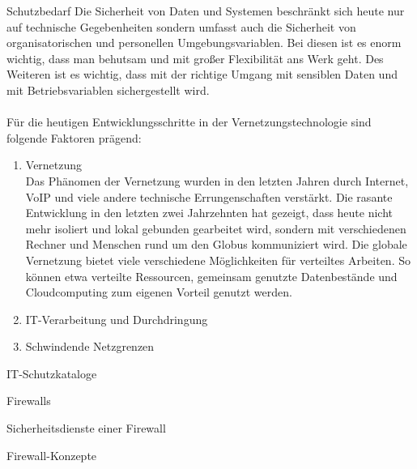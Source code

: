 \begin{section}{Schutzbedarf}
  Die Sicherheit von Daten und Systemen beschränkt sich heute nur auf technische 
  Gegebenheiten sondern umfasst auch die Sicherheit von organisatorischen und personellen 
  Umgebungsvariablen. Bei diesen ist es enorm wichtig, dass man behutsam und mit großer 
  Flexibilität ans Werk geht. Des Weiteren ist es wichtig, dass mit der richtige Umgang 
  mit sensiblen Daten und mit Betriebsvariablen sichergestellt wird. \\
  \\
  Für die heutigen Entwicklungsschritte in der Vernetzungstechnologie sind folgende 
  Faktoren prägend: \\
  
  \begin{enumerate} 
   \item Vernetzung \\
    Das Phänomen der Vernetzung wurden in den letzten Jahren durch Internet, VoIP und 
    viele andere technische Errungenschaften verstärkt. Die rasante Entwicklung in den 
    letzten zwei Jahrzehnten hat gezeigt, dass heute nicht mehr isoliert und lokal 
    gebunden gearbeitet wird, sondern mit verschiedenen Rechner und Menschen rund um den 
    Globus kommuniziert wird. Die globale Vernetzung bietet viele verschiedene 
    Möglichkeiten für verteiltes Arbeiten. So können etwa verteilte Ressourcen, gemeinsam 
    genutzte Datenbestände und Cloudcomputing zum eigenen Vorteil genutzt werden. \\
 
   \item IT-Verarbeitung und Durchdringung \\
 
 
   \item Schwindende Netzgrenzen \\
 
 
    \cite{BSIa}
   \end{enumerate}
 \end{section}

 \begin{section}{IT-Schutzkataloge}
  \cite{BSIITkat}
 \end{section}

 \label{Firewalls}
 \begin{section}{Firewalls}

  \label{Sicherheitsdienste einer Firewall}
  \begin{subsection}{Sicherheitsdienste einer Firewall}
  \end{subsection}
 
  \label{Firewall-Konzepte}
  \begin{subsection}{Firewall-Konzepte}
  \end{subsection}
 \end{section}
\pagebreak
